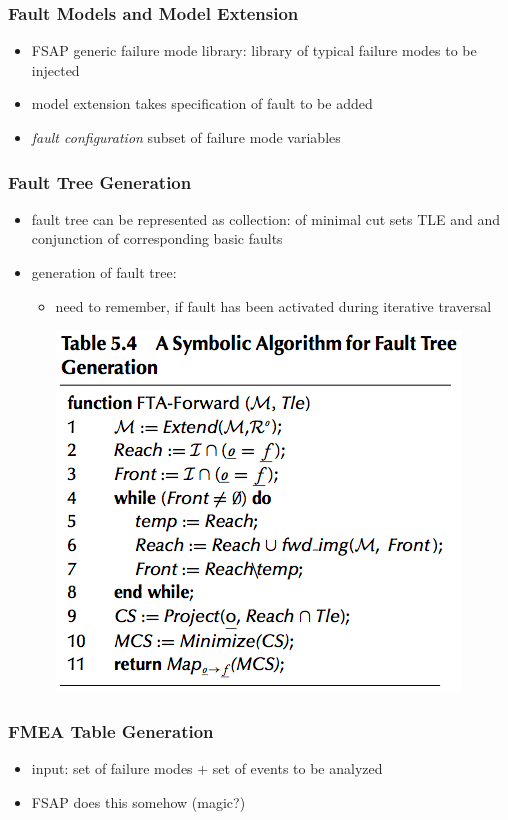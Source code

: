 \documentclass[a4paper, 10pt]{article}
\begin{document}
\subsubsection*{Fault Models and Model Extension}
\begin{itemize}
    \item FSAP generic failure mode library: library of typical failure modes to be injected
    \item model extension takes specification of fault to be added
    \item \emph{fault configuration} subset of failure mode variables
\end{itemize}

\subsubsection*{Fault Tree Generation}
\begin{itemize}
    \item fault tree can be represented as collection: of minimal cut sets TLE and and conjunction of corresponding basic faults
    \item generation of fault tree:
    \begin{itemize}
        \item need to remember, if fault has been activated during iterative traversal
        \begin{center}
            \includegraphics[width=.5\linewidth]{images/faultTreeGeneration.png}
        \end{center}
    \end{itemize}
\end{itemize}

\subsubsection*{FMEA Table Generation}
\begin{itemize}
    \item input: set of failure modes + set of events to be analyzed
    \item FSAP does this somehow (magic?)
\end{itemize}
\end{document}
